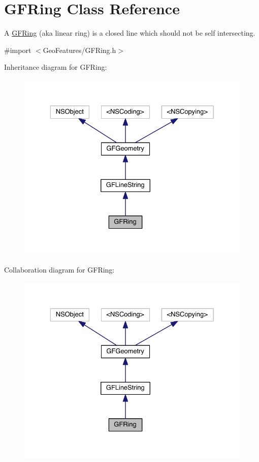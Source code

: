 \hypertarget{interface_g_f_ring}{}\section{G\+F\+Ring Class Reference}
\label{interface_g_f_ring}


A \hyperlink{interface_g_f_ring}{G\+F\+Ring} (aka linear ring) is a closed line which should not be self intersecting.  




{\ttfamily \#import $<$Geo\+Features/\+G\+F\+Ring.\+h$>$}



Inheritance diagram for G\+F\+Ring\+:\nopagebreak
\begin{figure}[H]
\begin{center}
\leavevmode
\includegraphics[width=329pt]{interface_g_f_ring__inherit__graph}
\end{center}
\end{figure}


Collaboration diagram for G\+F\+Ring\+:\nopagebreak
\begin{figure}[H]
\begin{center}
\leavevmode
\includegraphics[width=329pt]{interface_g_f_ring__coll__graph}
\end{center}
\end{figure}
